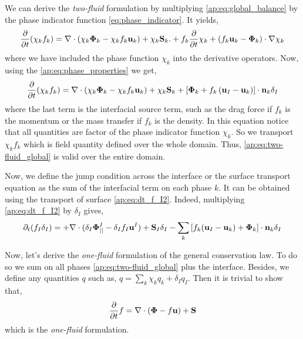 We can derive the \textit{two-fluid} formulation by multiplying \ref{ap:eq:global_balance} by the phase indicator function \ref{eq:phase_indicator}. 
It yields, 
\begin{equation*}
    \frac{\partial}{\partial t} (\chi_k f_k)
    = \mathbf{\nabla} \cdot (\chi_k \bm{\Phi}_k - \chi_k f_k \textbf{u}_k)
    + \chi_k \textbf{S}_k.
    + f_k \frac{\partial}{\partial t} \chi_k
    + \left(
        f_k \textbf{u}_k 
        - \bm{\Phi}_k
    \right) \cdot \mathbf{\nabla} \chi_k
\end{equation*}
where we have included the phase function $\chi_k$ into the derivative operators. 
Now, using the \ref{ap:eq:phase_properties} we get, 
\begin{equation}
    \frac{\partial}{\partial t} (\chi_k f_k)
    = \mathbf{\nabla} \cdot (\chi_k \bm{\Phi}_k - \chi_k f_k \textbf{u}_k)
    + \chi_k \textbf{S}_k
    + \left[
        \bm{\Phi}_k 
        + f_k 
        \left(
            \textbf{u}_I
            - \textbf{u}_k
        \right) 
    \right]
    \cdot \textbf{n}_k \delta_I 
    \label{ap:eq:two-fluid_global}
\end{equation}
where the last term is the interfacial source term, such as the drag force if $f_k$ is the momentum or the mass transfer if $f_k$ is the density. 
In this equation notice that all quantities are factor of the phase indicator function $\chi_k$. 
So we transport $\chi_k f_k$ which is field quantity defined over the whole domain. 
Thus, \ref{ap:eq:two-fluid_global} is valid over the entire domain.   

Now, we define the jump condition across the interface or the surface transport equation as the sum of the interfacial term on each phase $k$. 
It can be obtained using  the transport of surface \ref{ap:eq:dt_f_I2}.
Indeed, multiplying \ref{ap:eq:dt_f_I2} by $\delta_I$ gives, 
\begin{equation}
    \partial_t (f_I\delta_I)  
    = 
    + \mathbf{\nabla} \cdot (\delta_I \mathbf{\Phi}^I_{||} - \delta_I f_I \textbf{u}^I)
    +\textbf{S}_I \delta_I
    - \sum_k \left[
    f_k (\textbf{u}_I - \textbf{u}_k)
    + \mathbf{\Phi}_k
    \right] \cdot \textbf{n}_k \delta_I
    \label{ap:eq:general_jump}
\end{equation}

Now, let's derive the \textit{one-fluid} formulation of the general conservation law.
To do so we sum on all phases \ref{ap:eq:two-fluid_global} plus the interface. 
Besides, we define any quantities $q$ such as, $q = \sum_k \chi_k q_k + \delta_I q_I$.
Then it is trivial to show that, 
\begin{equation}
    \frac{\partial}{\partial t} f
    = \mathbf{\nabla} \cdot (\bm{\Phi} - f \textbf{u})
    + \textbf{S}
    \label{ap:eq:one-fluid_global}
\end{equation}
which is the \textit{one-fluid} formulation. 

